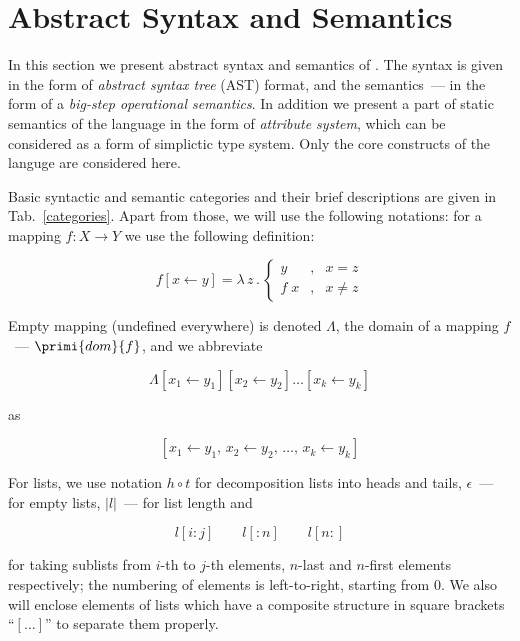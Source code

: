 \chapter{Abstract Syntax and Semantics}

In this section we present abstract syntax and semantics of \lama. The syntax is given in the form of \emph{abstract syntax tree} (AST) format,
and the semantics~--- in the form of a \emph{big-step operational semantics}. In addition we present a part of static semantics of the language
in the form of \emph{attribute system}, which can be considered as a form of simplictic type system. Only the core constructs of the languge
are considered here.

Basic syntactic and semantic categories and their brief descriptions are given in Tab.~\ref{categories}. Apart from those, we will use the
following notations: for a mapping $f : X\to Y$ we use the following definition:

\[
f [x\gets y] = \lambda\,z\,.\,
\left\{
\begin{array}{rcl}
  y    &,& x = z \\
  f\;x &,& x\neq z
\end{array}
\right.
\]

Empty mapping (undefined everywhere) is denoted $\Lambda$, the domain of a mapping $f$~--- $\primi{dom}{f}$, and we abbreviate

\[
  \Lambda[x_1\gets y_1][x_2\gets y_2]\dots[x_k\gets y_k]
\]

as

\[
  [x_1\gets y_1,\,x_2\gets y_2,\,\dots,\,x_k\gets y_k]
\]

For lists, we use notation $h\circ t$ for decomposition lists into heads and tails, $\epsilon$~--- for empty lists,
$|l|$~--- for list length and

\[
l[i:j]\qquad l[:n]\qquad l[n:]
\]

for taking sublists from $i$-th to $j$-th elements, $n$-last and $n$-first elements respectively; the numbering
of elements is left-to-right, starting from $0$. We also will enclose elements of lists which have a
composite structure in square brackets ``$[\dots]$'' to separate them properly.


\FloatBarrier


%
